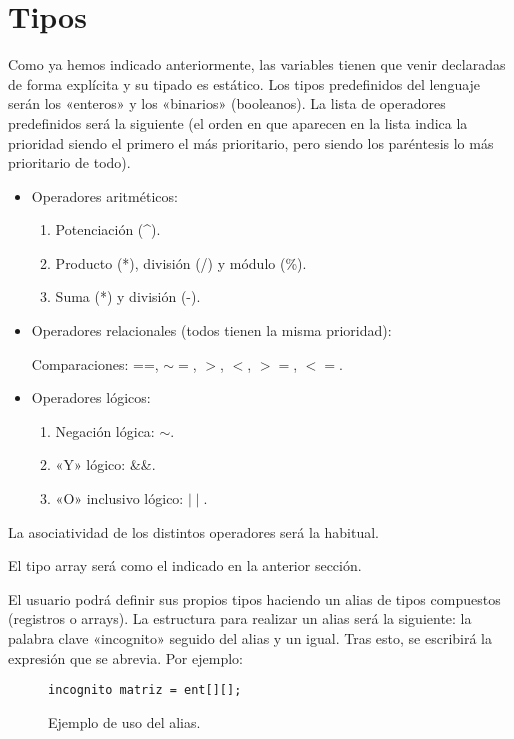 \section*{Tipos}
Como ya hemos indicado anteriormente, las variables tienen que venir declaradas
de forma explícita y su tipado es estático. Los tipos predefinidos del lenguaje
serán los «enteros» y los «binarios» (booleanos). La lista de operadores
predefinidos será la siguiente (el orden en que aparecen en la lista indica la
prioridad siendo el primero el más prioritario, pero siendo los paréntesis lo
más prioritario de todo).
\begin{itemize}
\item Operadores aritméticos:
    \begin{enumerate}
        \item Potenciación (\^{}).
        \item Producto (*), división (/) y módulo (\%).
        \item Suma (*) y división (-).
    \end{enumerate}
\item Operadores relacionales (todos tienen la misma prioridad):

Comparaciones: ==, $\sim =$, $>$, $<$, $>=$, $<=$.

\item Operadores lógicos:
\begin{enumerate}
    \item Negación lógica: $\sim$.
    \item «Y» lógico: \&\&.
    \item «O» inclusivo lógico: $\mid \mid$.
\end{enumerate}
\end{itemize}
La asociatividad de los distintos operadores será la habitual.

El tipo array será como el indicado en la anterior sección.

El usuario podrá definir sus propios tipos haciendo un alias de tipos
compuestos (registros o arrays). La estructura para realizar un alias será la
siguiente: la palabra clave «incognito» seguido del alias y un igual. Tras esto,
se escribirá la expresión que se abrevia. Por ejemplo:
\begin{figure}[H]
    \centering
    \begin{lstlisting}
incognito matriz = ent[][];
    \end{lstlisting}
    \caption{Ejemplo de uso del alias.}
\end{figure}

